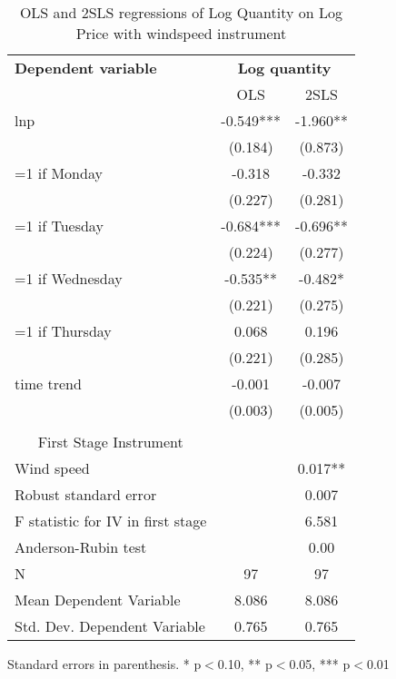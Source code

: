 \begin{table}[htbp]\centering
\scriptsize
\caption{OLS and 2SLS regressions of Log Quantity on Log Price with windspeed instrument}
\label{2sls_3}
\begin{center}
\begin{threeparttable}
\begin{tabular}{l*{2}{c}}
\toprule
\multicolumn{1}{l}{\textbf{Dependent variable}}&
\multicolumn{2}{c}{\textbf{Log quantity}}\\
\multicolumn{1}{c}{}&
\multicolumn{1}{c}{OLS}&
\multicolumn{1}{c}{2SLS}\\
\midrule
lnp                 &      -0.549***&      -1.960** \\
                    &     (0.184)   &     (0.873)   \\
=1 if Monday        &      -0.318   &      -0.332   \\
                    &     (0.227)   &     (0.281)   \\
=1 if Tuesday       &      -0.684***&      -0.696** \\
                    &     (0.224)   &     (0.277)   \\
=1 if Wednesday     &      -0.535** &      -0.482*  \\
                    &     (0.221)   &     (0.275)   \\
=1 if Thursday      &       0.068   &       0.196   \\
                    &     (0.221)   &     (0.285)   \\
time trend          &      -0.001   &      -0.007   \\
                    &     (0.003)   &     (0.005)   \\
\\
\midrule
\multicolumn{1}{c}{First Stage Instrument}\\
Wind speed          &               &       0.017** \\
Robust standard error &               &       0.007   \\
F statistic for IV in first stage&               &       6.581   \\
Anderson-Rubin test &               &        0.00   \\
N                   &          97   &          97   \\
Mean Dependent Variable&       8.086   &       8.086   \\
Std. Dev. Dependent Variable&       0.765   &       0.765   \\
\bottomrule
\end{tabular}
\begin{tablenotes}
\tiny
\item Standard errors in parenthesis. * p$<$0.10, ** p$<$0.05, *** p$<$0.01
\end{tablenotes}
\end{threeparttable}
\end{center}
\end{table}
